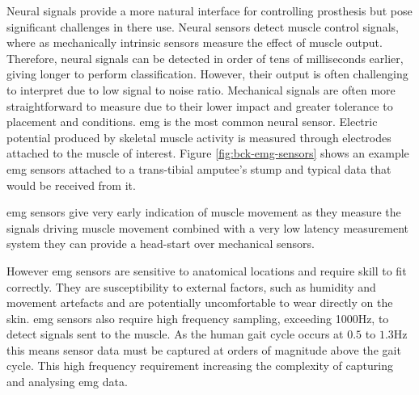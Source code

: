 Neural signals provide a more natural interface for controlling prosthesis\cite{He2018} but pose significant challenges in there use. Neural sensors detect muscle control signals, where as mechanically intrinsic sensors measure the effect of muscle output. Therefore, neural signals can be detected in order of tens of milliseconds earlier\cite{Tucker2015}, giving longer to perform classification. However, their output is often challenging to interpret due to low signal to noise ratio. Mechanical signals are often more straightforward to measure due to their lower impact and greater tolerance to placement and conditions.\cite{Koller2018} \acrlong{emg} is the most common neural sensor. Electric potential produced by skeletal muscle activity is measured through electrodes attached to the muscle of interest. Figure \ref{fig:bck-emg-sensors} shows an example \acrshort{emg} sensors attached to a trans-tibial amputee's stump and typical data that would be received from it.

\acrshort{emg} sensors give very early indication of muscle movement as they measure the signals driving muscle movement\cite{Godiyal2018a, Bangaru2020, Huang2011} combined with a very low latency measurement system they can provide a head-start over mechanical sensors\cite{Tucker2015}.

However \acrshort{emg} sensors are sensitive to anatomical locations and require skill to fit correctly\cite{Rainoldi2004, Seniam}. They are susceptibility to external factors, such as humidity and movement artefacts\cite{Bangaru2020} and are potentially uncomfortable to wear directly on the skin\cite{Godiyal2018a}. \acrshort{emg} sensors also require high frequency sampling, exceeding 1000Hz, to detect signals sent to the muscle\cite{Huang2011, Young2013}. As the human gait cycle occurs at $0.5$ to $1.3$Hz\cite{Elery2020} this means sensor data must be captured at orders of magnitude above the gait cycle. This high frequency requirement increasing the complexity of capturing and analysing \acrshort{emg} data.


